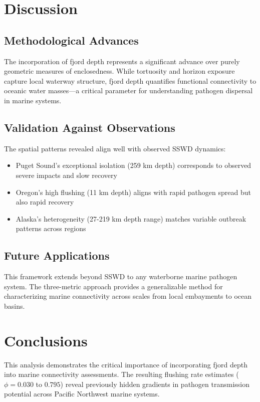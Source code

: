 \documentclass[11pt,a4paper]{article}
\begin{document}
\section{Discussion}

\subsection{Methodological Advances}

The incorporation of fjord depth represents a significant advance over purely geometric measures of enclosedness. While tortuosity and horizon exposure capture local waterway structure, fjord depth quantifies functional connectivity to oceanic water masses—a critical parameter for understanding pathogen dispersal in marine systems.

\subsection{Validation Against Observations}

The spatial patterns revealed align well with observed SSWD dynamics:
\begin{itemize}
    \item Puget Sound's exceptional isolation (259 km depth) corresponds to observed severe impacts and slow recovery
    \item Oregon's high flushing (11 km depth) aligns with rapid pathogen spread but also rapid recovery
    \item Alaska's heterogeneity (27-219 km depth range) matches variable outbreak patterns across regions
\end{itemize}

\subsection{Future Applications}

This framework extends beyond SSWD to any waterborne marine pathogen system. The three-metric approach provides a generalizable method for characterizing marine connectivity across scales from local embayments to ocean basins.

\section{Conclusions}

This analysis demonstrates the critical importance of incorporating fjord depth into marine connectivity assessments. The resulting flushing rate estimates ($\phi = 0.030$ to $0.795$) reveal previously hidden gradients in pathogen transmission potential across Pacific Northwest marine systems.
\end{document}
